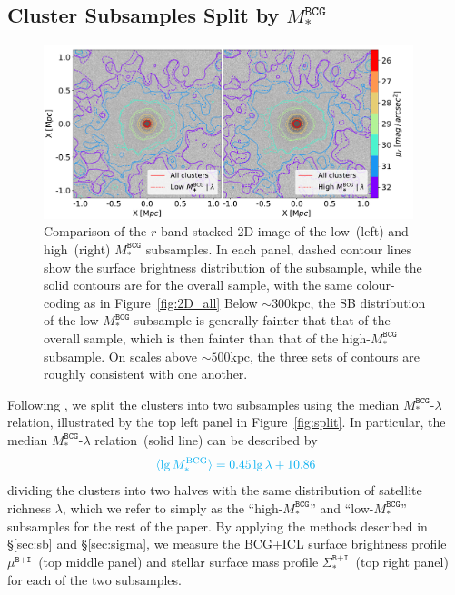 \documentclass[fleqn,usenatbib]{mnras}
\newcommand{\sigbi}{\Sigma_*^{\texttt{B+I}}}
\newcommand{\mubi}{\mu^{\texttt{B+I}}}
\newcommand{\msbcg}{M_*^{\texttt{BCG}}}
\newcommand{\kpc}{\mathrm{kpc}}
\newcommand\xkchen[1]{{\color{cyan} {#1}}}
\begin{document}
\subsection{Cluster Subsamples Split by \texorpdfstring{$\msbcg$}{Mstar}}
\label{subsec:split}

\begin{figure}
    \centering\includegraphics[width=0.96\textwidth]{fig/BCG_Mstar_bin_r-band_2D_signal.pdf}
    \caption{Comparison of the $r$-band stacked 2D image of the low~(left)
    and high~(right) $\msbcg$ subsamples. In each panel, dashed contour
    lines show the surface brightness distribution of the subsample, while
    the solid contours are for the overall sample, with the same
    colour-coding as in Figure~\ref{fig:2D_all} Below ${\sim}300\kpc$, the
    SB distribution of the low-$\msbcg$ subsample is generally fainter that
    that of the overall sample, which is then fainter than that of the
    high-$\msbcg$ subsample. On scales above ${\sim}500\kpc$, the three
    sets of contours are roughly consistent with one another.
    \label{fig:image2Dsub} }
\end{figure}


Following , we split the clusters into two subsamples
using the median $\msbcg$-$\lambda$ relation, illustrated by the top left
panel in Figure~\ref{fig:split}. In particular, the median
$\msbcg$-$\lambda$ relation~(solid line) can be described by
\begin{equation}
    \xkchen{ \langle \lg M_{\ast}^{\mathrm{BCG}} \rangle = 0.45 \lg \lambda + 10.86 }
\end{equation}
dividing the clusters into two halves with the same distribution of
satellite richness $\lambda$, which we refer to simply as the
``high-$\msbcg$'' and ``low-$\msbcg$'' subsamples for the rest of the
paper. By applying the methods described in \S\ref{sec:sb} and
\S\ref{sec:sigma}, we measure the BCG+ICL surface brightness profile
$\mubi$~(top middle panel) and stellar surface mass profile $\sigbi$~(top
right panel) for each of the two subsamples.
\end{document}
